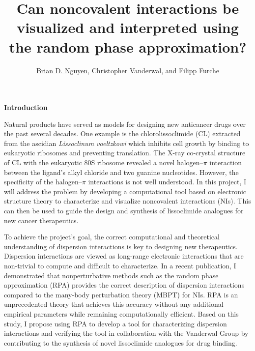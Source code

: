 \documentclass[11pt]{article}
\title{\vspace{-0.8in}\textbf{Can noncovalent interactions be visualized
    and interpreted using the random phase approximation?}}
\author{\underline{Brian D. Nguyen}, Christopher Vanderwal, and Filipp Furche}
\date{}%
\begin{document}
\maketitle
\vspace{-0.4in}

\textbf{Introduction}

Natural products have served as models for designing new anticancer
drugs over the past several decades.\autocite{Dias12Metabolites2p303,Butler04JNatProd67p2141}
One example is the chlorolissoclimide (CL) extracted from the ascidian
\textit{Lissoclinum voeltzkowi} which inhibits cell growth by binding to
eukaryotic ribosomes and preventing translation.\autocite{Robert06RNA12p717}
The X-ray co-crystal structure of CL with the eukaryotic 80S ribosome revealed
a novel halogen--$\pi$ interaction between the ligand's alkyl chloride and two
guanine nucleotides.\autocite{Imai08ProteinScience17p1129,Konst2017} 
However, the specificity of the halogen--$\pi$ interactions is not well
understood. In this project, I will address the problem by developing a
computational tool based on electronic structure theory to characterize
and visualize noncovalent interactions (NIs). This can then be used to
guide the design and synthesis of lissoclimide analogues for new cancer
therapeutics.

To achieve the project's goal, the correct computational and theoretical
understanding of dispersion interactions is key to designing new therapeutics.
Dispersion interactions are viewed as long-range electronic interactions that
are non-trivial to compute and difficult to characterize. In a recent publication,
I demonstrated that nonperturbative methods such as the random phase approximation
(RPA) provides the correct description of dispersion interactions compared
to the many-body perturbation theory (MBPT) for NIs.\autocite{Nguyen20JChemTheoryComput16p2258}
RPA is an unprecedented theory that achieves this accuracy without any
additional empirical parameters while remaining computationally efficient.\autocite{doi:10.1063/1.3442749}
Based on this study, I propose using RPA to develop a tool for characterizing
dispersion interactions and verifying the tool in collaboration with the
Vanderwal Group by contributing to the synthesis of novel lissoclimide analogues
for drug binding.
\end{document}
